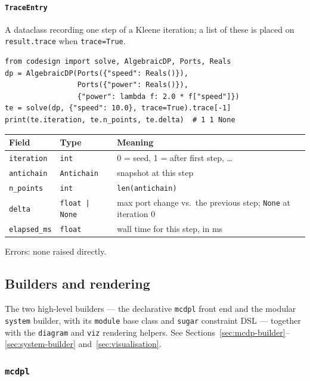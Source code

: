 \documentclass[11pt,a4paper]{article}
\begin{document}
\paragraph{\texttt{TraceEntry}}
\label{ref:solver:traceentry}
A dataclass recording one step of a Kleene iteration; a list of these is
placed on \texttt{result.trace} when \texttt{trace=True}.
\begin{lstlisting}
from codesign import solve, AlgebraicDP, Ports, Reals
dp = AlgebraicDP(Ports({"speed": Reals()}),
                 Ports({"power": Reals()}),
                 {"power": lambda f: 2.0 * f["speed"]})
te = solve(dp, {"speed": 10.0}, trace=True).trace[-1]
print(te.iteration, te.n_points, te.delta)  # 1 1 None
\end{lstlisting}
\begin{center}
\begin{tabular}{@{}lll@{}}
\toprule
Field & Type & Meaning \\
\midrule
\texttt{iteration} & \texttt{int} & 0 = seed, 1 = after first step, \ldots \\
\texttt{antichain} & \texttt{Antichain} & snapshot at this step \\
\texttt{n\_points} & \texttt{int} & \texttt{len(antichain)} \\
\texttt{delta} & \texttt{float | None} & max port change vs.\ the previous
  step; \texttt{None} at iteration 0 \\
\texttt{elapsed\_ms} & \texttt{float} & wall time for this step, in ms \\
\bottomrule
\end{tabular}
\end{center}
Errors: none raised directly.

\subsection{Builders and rendering}

The two high-level builders --- the declarative \texttt{mcdpl} front end
and the modular \texttt{system} builder, with its \texttt{module} base
class and \texttt{sugar} constraint DSL --- together with the
\texttt{diagram} and \texttt{viz} rendering helpers. See
Sections~\ref{sec:mcdp-builder}--\ref{sec:system-builder}
and~\ref{sec:visualisation}.

\subsubsection{\texttt{mcdpl}}
\label{ref:mcdpl}
\end{document}
